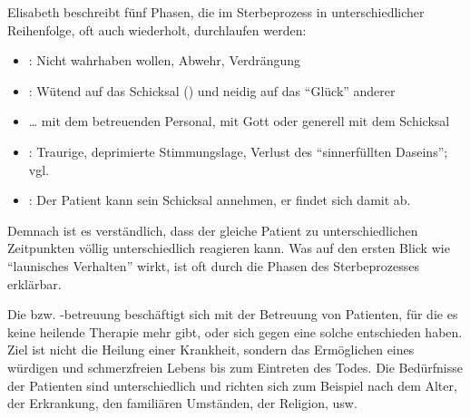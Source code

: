 Elisabeth  beschreibt fünf Phasen, die im
Sterbeprozess in unterschiedlicher Reihenfolge, oft auch
wiederholt, durchlaufen werden:

\begin{itemize}
  \item {}: Nicht wahrhaben wollen, Abwehr,
  Verdrängung
  \item {}: Wütend auf das
  Schicksal () und neidig auf das \enquote{Glück} anderer
  \item {} {\ldots} mit dem
  betreuenden Personal, mit Gott oder generell mit dem
  Schicksal
  \item {}: Traurige,
  deprimierte Stimmungslage, Verlust des \enquote{sinnerfüllten
  Daseins}; vgl. 
  \item {}: Der Patient kann sein Schicksal
  annehmen, er findet sich damit ab.
\end{itemize}

Demnach ist es verständlich, dass der gleiche Patient zu
unterschiedlichen Zeitpunkten völlig unterschiedlich
reagieren kann. Was auf den ersten Blick wie \enquote{launisches
Verhalten} wirkt, ist oft durch die Phasen des
Sterbeprozesses erklärbar.


{%
\label{topic:palliativbehandlung-tod}%
Die  bzw. -betreuung beschäftigt
sich mit der Betreuung von Patienten, für die es keine heilende Therapie mehr
gibt, oder sich gegen eine solche entschieden haben.
Ziel ist nicht die Heilung einer Krankheit, sondern das
Ermöglichen eines würdigen und schmerzfreien Lebens bis zum Eintreten des Todes.
Die Bedürfnisse der Patienten sind unterschiedlich und richten
sich zum Beispiel nach dem Alter, der Erkrankung, den
familiären Umständen, der Religion, usw.}
{}
{}
{}
{}


